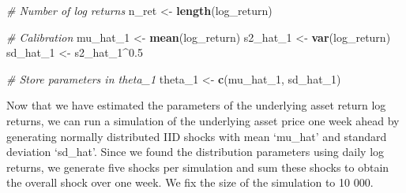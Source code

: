 \documentclass[]{article}
\newenvironment{Shaded}{\begin{snugshade}}{\end{snugshade}}
\newcommand{\CommentTok}[1]{\textcolor[rgb]{0.56,0.35,0.01}{\textit{#1}}}
\newcommand{\DecValTok}[1]{\textcolor[rgb]{0.00,0.00,0.81}{#1}}
\newcommand{\FloatTok}[1]{\textcolor[rgb]{0.00,0.00,0.81}{#1}}
\newcommand{\KeywordTok}[1]{\textcolor[rgb]{0.13,0.29,0.53}{\textbf{#1}}}
\newcommand{\NormalTok}[1]{#1}
\newcommand{\OperatorTok}[1]{\textcolor[rgb]{0.81,0.36,0.00}{\textbf{#1}}}
\newcommand{\StringTok}[1]{\textcolor[rgb]{0.31,0.60,0.02}{#1}}
\begin{document}
\begin{Shaded}
\begin{Highlighting}[]
\CommentTok{\# Number of log returns}
\NormalTok{n\_ret <{-}}\StringTok{ }\KeywordTok{length}\NormalTok{(log\_return)}

\CommentTok{\# Calibration}
\NormalTok{mu\_hat\_}\DecValTok{1}\NormalTok{ <{-}}\StringTok{ }\KeywordTok{mean}\NormalTok{(log\_return)}
\NormalTok{s2\_hat\_}\DecValTok{1}\NormalTok{ <{-}}\StringTok{ }\KeywordTok{var}\NormalTok{(log\_return)}
\NormalTok{sd\_hat\_}\DecValTok{1}\NormalTok{  <{-}}\StringTok{ }\NormalTok{s2\_hat\_}\DecValTok{1}\OperatorTok{\^{}}\FloatTok{0.5}

\CommentTok{\# Store parameters in \textquotesingle{}theta\_1\textquotesingle{}}
\NormalTok{theta\_}\DecValTok{1}\NormalTok{ <{-}}\StringTok{ }\KeywordTok{c}\NormalTok{(mu\_hat\_}\DecValTok{1}\NormalTok{, sd\_hat\_}\DecValTok{1}\NormalTok{)}
\end{Highlighting}
\end{Shaded}

Now that we have estimated the parameters of the underlying asset return
log returns, we can run a simulation of the underlying asset price one
week ahead by generating normally distributed IID shocks with mean
`mu\_hat' and standard deviation `sd\_hat'. Since we found the
distribution parameters using daily log returns, we generate five shocks
per simulation and sum these shocks to obtain the overall shock over one
week. We fix the size of the simulation to 10 000.
\end{document}
